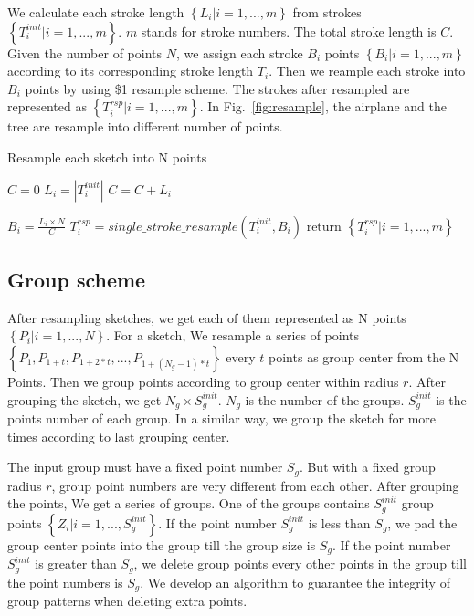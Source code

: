  We calculate each stroke length $\left\{ L_i| i = 1, ..., m \right\}$ from strokes $\left\{ T_i^{init}| i = 1, ..., m \right\}$. $m$ stands for stroke numbers. The total stroke length is $C$. Given the number of points $N$, we assign each stroke $B_i$ points $\left\{ B_i| i = 1, ..., m \right\}$ according to its corresponding stroke length $T_i$. Then we reample each stroke into $B_i$ points by using \$1 \cite{Wobbrock2007GesturesWL} resample scheme. The strokes after resampled are represented as $\left\{ T_i^{rsp}| i = 1, ..., m \right\}$. In Fig.~\ref{fig:resample}, the airplane and the tree are resample into different number of points.

\begin{algorithm}
\label{alg:resample}
    \caption{Resample each sketch into N points}
    $C = 0$\;
    {
        $L_i = |T_i^{init}|$\;
        $C = C + L_i$\;
    }

    {
        $B_i = \frac{L_i \times N}{C}$\;
        $T_i^{rsp} = single\_stroke\_resample(T_i^{init}, B_i)$\;
    }
    return $\left\{ T_i^{rsp}| i = 1, ..., m \right\}$\;
\end{algorithm}



\subsection{Group scheme}
\label{ssec:group_scheme}

After resampling sketches, we get each of them represented as N points $\left\{P_i| i = 1,..., N\right\}$. For a sketch, We resample a series of points $\left\{P_{1}, P_{1+t}, P_{1+2*t}, ..., P_{1+(N_g-1)*t}\right\}$ every $t$ points as group center from the N Points. Then we group points according to group center within radius $r$. After grouping the sketch, we get $N_{g} \times S_{g}^{init}$. $N_{g}$ is the number of the groups. $S_{g}^{init}$ is the points number of each group. In a similar way, we group the sketch for more times according to last grouping center.

The input group must have a fixed point number $S_g$. But with a fixed group radius $r$, group point numbers are very different from each other. After grouping the points, We get a series of groups. One of the groups contains $S_g^{init}$ group points $\left\{ Z_i| i = 1, ..., S_g^{init} \right\}$. If the point number $S_g^{init}$ is less than $S_{g}$, we pad the group center points into the group till the group size is $S_{g}$. If the point number $S_g^{init}$ is greater than $S_{g}$, we delete group points every other points in the group till the point numbers is $S_{g}$. We develop an algorithm to guarantee the integrity of group patterns when deleting extra points.

